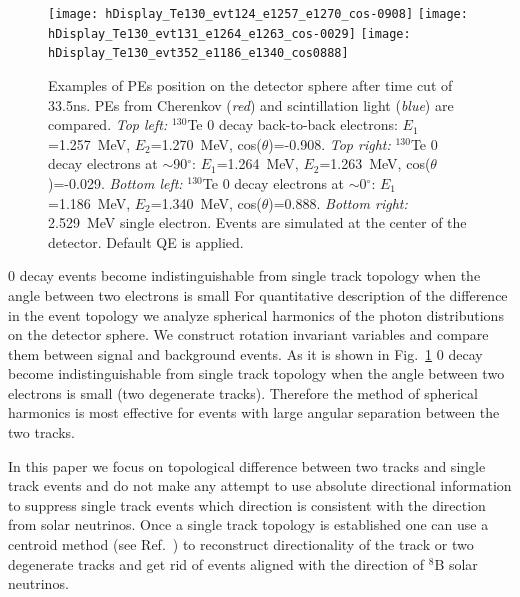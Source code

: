 \begin{figure}[h]
  \centering
  \texttt{[image: hDisplay\_Te130\_evt124\_e1257\_e1270\_cos-0908]}
  \texttt{[image: hDisplay\_Te130\_evt131\_e1264\_e1263\_cos-0029]}
  \texttt{[image: hDisplay\_Te130\_evt352\_e1186\_e1340\_cos0888]}
  \caption{Examples of PEs position on the detector sphere after time
    cut of 33.5ns. PEs from Cherenkov (\emph{red}) and scintillation
    light (\emph{blue}) are compared. \emph{Top left:} $^{130}$Te
    0{\nbb} decay back-to-back electrons: $E_1$=1.257~MeV,
    $E_2$=1.270~MeV, cos($\theta$)=-0.908. \emph{Top right:}
    $^{130}$Te 0{\nbb} decay electrons at $\sim$90$^{\circ}$:
    $E_1$=1.264~MeV, $E_2$=1.263~MeV,
    cos($\theta$)=-0.029. \emph{Bottom left:} $^{130}$Te 0{\nbb} decay
    electrons at $\sim$0$^{\circ}$: $E_1$=1.186~MeV, $E_2$=1.340~MeV,
    cos($\theta$)=0.888. \emph{Bottom right:} 2.529~MeV single
    electron. Events are simulated at the center of the
    detector. Default QE is applied.}
\label{fig:Display_Te130}
\end{figure}


0{\nbb} decay events become indistinguishable from single track
topology when the angle between two electrons is small For
quantitative description of the difference in the event topology we
analyze spherical harmonics of the photon distributions on the
detector sphere. We construct rotation invariant variables and compare
them between signal and background events. As it is shown in
Fig.~\ref{fig:Display_Te130} 0{\nbb} decay become indistinguishable
from single track topology when the angle between two electrons is
small (two degenerate tracks). Therefore the method of spherical
harmonics is most effective for events with large angular separation
between the two tracks.

In this paper we focus on topological difference between two tracks
and single track events and do not make any attempt to use absolute
directional information to suppress single track events which
direction is consistent with the direction from solar neutrinos. Once
a single track topology is established one can use a centroid method
(see Ref.~\cite{Aberle2014}) to reconstruct directionality of the
track or two degenerate tracks and get rid of events aligned with the
direction of $^{8}$B solar neutrinos.

